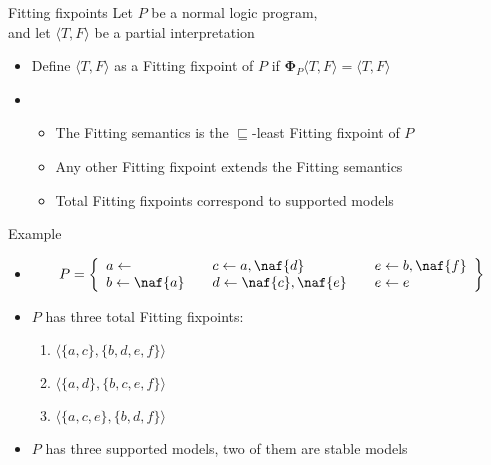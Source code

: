 \begin{frame}{Fitting fixpoints}
  \bigskip
  Let $P$ be a normal logic program,\\ and
  let $\langle T,F \rangle$ be a partial interpretation
  \medskip
  \begin{itemize}
  \item<1-> Define
    $\langle T,F \rangle$ as a \alert{Fitting fixpoint} of $P$
    if
    ${\mathbf{\Phi}}_P\langle T,F \rangle = \langle T,F \rangle$
  \medskip
  \item<2-> []
    \begin{itemize}
    \item The Fitting semantics is the $\sqsubseteq$-least Fitting fixpoint of $P$
    \item Any other Fitting fixpoint extends the Fitting semantics
    \item Total Fitting fixpoints correspond to supported models
    \end{itemize}
  \end{itemize}
\end{frame}
\begin{frame}{Example}
  \bigskip
  \begin{itemize}
  \item<1-> []
    \[
    P
    =
    \left\{
      \begin{array}{lll}
        a \leftarrow                  \quad &
        c \leftarrow a, \naf{d}       \quad &
        e \leftarrow b, \naf{f}
        \\
        b \leftarrow \naf{a}          \quad &
        d \leftarrow \naf{c}, \naf{e} \quad &
        e \leftarrow e
      \end{array}
    \right\}
    \]
    \bigskip
  \item<2-> $P$ has three total Fitting fixpoints\pause[3]:
    \begin{enumerate}
    \item<3-> $\langle \{a,c\}, \{b,d,e,f\} \rangle$
    \item<3-> $\langle \{a,d\}, \{b,c,e,f\} \rangle$
    \item<3-> $\langle \{a,c,e\}, \{b,d,f\} \rangle$
    \end{enumerate}
    \medskip
  \item <4-> $P$ has three supported models, two of them are stable models
  \end{itemize}

\end{frame}
